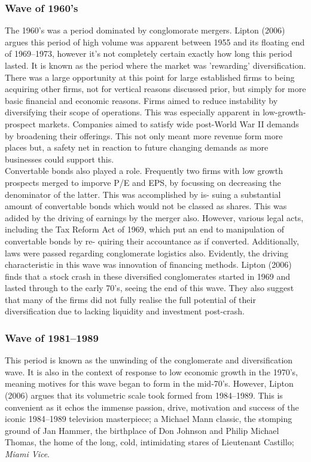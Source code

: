\documentclass[11pt, english]{article}
\begin{document}
		\subsubsection*{Wave of 1960's}

	The 1960's was a period dominated by conglomorate mergers. Lipton (2006) argues this period of high volume was apparent between 1955 and its floating end of 1969--1973, however it's not completely certain exactly how long this period lasted. It is known as the period where the market was 'rewarding' diversification. There was a large opportunity at this point for large established firms to being acquiring other firms, not for vertical reasons discussed prior, but simply for more basic financial and economic reasons. Firms aimed to reduce instability by diversifying their scope of operations. This was especially apparent in low-growth-prospect markets. Companies aimed to satisfy wide post-World War II demands by broadening their offerings. This not only meant more revenue form more places but, a safety net in reaction to future changing demands as more businesses could support this.\\

	Convertable bonds also played a role. Frequently two firms with low growth prospects merged to imporve P/E and EPS, by focussing on decreasing the denominator of the latter. This was accomplished by is- suing a substantial amount of convertable bonds which would not be classed as shares. This was adided by the driving of earnings by the merger also. However, various legal acts, including the Tax Reform Act of 1969, which put an end to manipulation of convertable bonds by re- quiring their accountance as if converted. Additionally, laws were passed regarding conglomerate logistics also. Evidently, the driving characteristic in this wave was innovation of financing methods. Lipton (2006) finds that a stock crash in these diversified conglomerates started in 1969 and lasted through to the early 70's, seeing the end of this wave. They also suggest that many of the firms did not fully realise the full potential of their diversification due to lacking liquidity and investment post-crash.

		\subsubsection*{Wave of 1981--1989}

	This period is known as the unwinding of the conglomerate and diversification wave. It is also in the context of response to low economic growth in the 1970's, meaning motives for this wave began to form in the mid-70's. However, Lipton (2006) argues that its volumetric scale took formed from 1984--1989. This is convenient as it echos the immense passion, drive, motivation and success of the iconic 1984--1989 television masterpiece; a Michael Mann classic, the stomping ground of Jan Hammer, the birthplace of Don Johnson and Philip Michael Thomas, the home of the long, cold, intimidating stares of Lieutenant Castillo; \textit{Miami Vice}.\\
\end{document}
